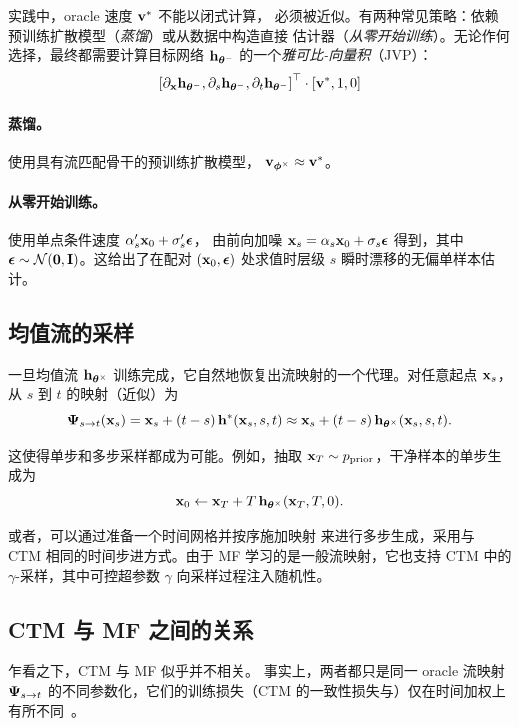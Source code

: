实践中，oracle 速度 ${\mathbf{v}}^*$ 不能以闭式计算，
必须被近似。有两种常见策略：依赖
预训练扩散模型（\emph{蒸馏}）或从数据中构造直接
估计器（\emph{从零开始训练}）。无论作何选择，最终都需要计算目标网络
${\mathbf{h}}_{{\bm{\theta}}^-}$ 的一个\emph{雅可比-向量积}（JVP）：
\[
\left[\partial_{\mathbf{x}} {\mathbf{h}}_{{\bm{\theta}}^-}, \partial_s {\mathbf{h}}_{{\bm{\theta}}^-}, \partial_t {\mathbf{h}}_{{\bm{\theta}}^-}\right]^\top \cdot \left[{\mathbf{v}}^*, 1, 0\right]
\]


\paragraph{蒸馏。}
使用具有流匹配骨干的预训练扩散模型，
${\mathbf{v}}_{{\bm{\phi}}^\times} \approx {\mathbf{v}}^*$。

\paragraph{从零开始训练。}
使用单点条件速度 $\alpha_s'{\mathbf{x}}_0 + \sigma_s'{\bm{\epsilon}}$，
由前向加噪 ${\mathbf{x}}_s=\alpha_s{\mathbf{x}}_0+\sigma_s{\bm{\epsilon}}$ 得到，其中
${\bm{\epsilon}}\sim\mathcal N(\bm{0},{\mathbf{I}})$。这给出了在配对 $({\mathbf{x}}_0,{\bm{\epsilon}})$ 处求值时层级 $s$ 瞬时漂移的无偏单样本估计。


\subsection{均值流的采样}
一旦均值流 ${\mathbf{h}}_{{\bm{\theta}}^\times}$ 训练完成，它自然地恢复出流映射的一个代理。对任意起点 ${\mathbf{x}}_s$，从 $s$ 到 $t$ 的映射（近似）为
\[
{\bm{\Psi}}_{s\to t}({\mathbf{x}}_s) = {\mathbf{x}}_s + (t-s)\,{\mathbf{h}}^*({\mathbf{x}}_s,s,t)
  \approx   {\mathbf{x}}_s + (t-s)\,{\mathbf{h}}_{{\bm{\theta}}^\times}({\mathbf{x}}_s,s,t).
\]

这使得单步和多步采样都成为可能。例如，抽取
${\mathbf{x}}_T\sim p_{\mathrm{prior}}$，干净样本的单步生成为
\[
{\mathbf{x}}_0  \leftarrow  {\mathbf{x}}_T + T\,{\mathbf{h}}_{{\bm{\theta}}^\times}({\mathbf{x}}_T,T,0).
\]

或者，可以通过准备一个时间网格并按序施加映射
来进行多步生成，采用与
CTM 相同的时间步进方式。由于 MF 学习的是一般流映射，它也支持
CTM 中的 $\gamma$-采样，其中可控超参数 $\gamma$ 向采样过程注入随机性。



\subsection{CTM 与 MF 之间的关系}\label{subsec:equivalence-ctm-mf}
乍看之下，CTM 与 MF 似乎并不相关。
事实上，两者都只是同一 oracle 流映射 ${\bm{\Psi}}_{s\to t}$ 的不同参数化，它们的训练损失（CTM 的一致性损失与）仅在时间加权上有所不同~\citep{hu2025cmt}。

